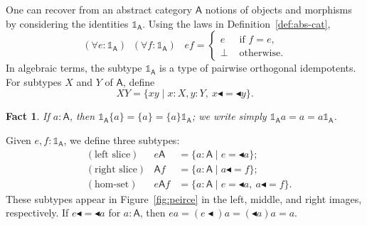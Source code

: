 \documentclass{amsart}
\newcommand{\tin}{:}
\newcommand{\Cat}[1]{\mathsf{#1}}
\newcommand{\cat}[1]{\Cat{#1}}
\newcommand{\acat}[1]{\mathsf{#1}}
\numberwithin{lstfloat}{section}
\newcommand{\srcfunc}{\mathbin{\blacktriangleleft}}
\newcommand{\tgtfunc}{\mathbin{\blacktriangleleft}}
\newcommand{\src}[1]{#1\srcfunc}
\newcommand{\tgt}[1]{\tgtfunc #1}
\newcommand{\one}{\mathbb{1}}
\newtheorem{fact}[thm]{Fact}
\theoremstyle{definition}
\theoremstyle{remark}
\numberwithin{equation}{section}
\begin{document}
One can recover from an abstract category $\acat{A}$ notions of objects and
morphisms by considering the identities $\one_{\cat{A}}$. Using the laws in
Definition~\ref{def:abs-cat},
\[
 (\forall e\tin \one_{\cat{A}})\;\;(\forall f\tin \one_{\cat{A}}) \;\;\;
    ef = 
    \begin{cases}
      e  & \text{ if } f = e, \\ 
      \bot & \text{ otherwise}. 
    \end{cases}
\]
In algebraic terms, the subtype $\one_{\cat{A}}$ is a type of pairwise 
orthogonal idempotents. For subtypes $X$ and $Y$ of $\acat{A}$, define
\[ 
 XY=\{xy\mid x\tin X, y\tin Y,\ \src{x}=\tgt{y}\}. 
\]

\begin{fact}\label{fact:capsule}
  If $a\tin\acat{A}$, then $\one_{\cat{A}} \{a\}=\{a\}=\{a\} \one_{\cat{A}}$;
  we write simply $\one_{\cat{A}} a=a=a\one_{\cat{A}}$.
\end{fact}

\noindent Given $e,f\tin\one_{\cat{A}}$, we define three subtypes:
\begin{align*}
  & (\text{left slice}) & e\acat{A} & = \{a\tin \acat{A} \mid e=\tgt{a}\}; \\
  & (\text{right slice}) & \acat{A}f & = \{ a\tin \acat{A} \mid \src{a}=f\};
  \\
  & (\text{hom-set}) & e\acat{A}f & = \{ a\tin \acat{A} \mid  e=\tgt{a},\ \src{a}=f\}.
\end{align*}
These subtypes appear in Figure~\ref{fig:peirce} in the left, middle, and right
images, respectively. If $\src{e}=\tgt{a}$ for $a:\acat{A}$, then
$ea=(\src{e})a=(\tgt{a})a=a$.
\end{document}
